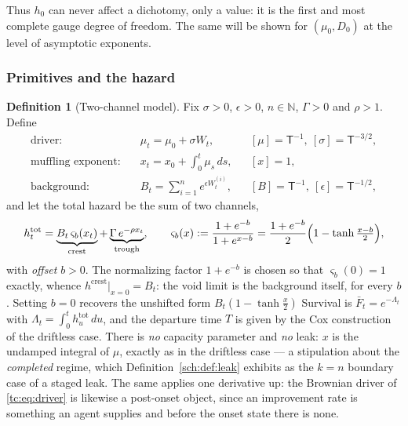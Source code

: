 \documentclass[11pt]{article}
\numberwithin{equation}{section}
\theoremstyle{plain}
\theoremstyle{definition}
\newtheorem{definition}[theorem]{Definition}
\theoremstyle{remark}
\begin{document}
Thus $h_0$ can never affect a dichotomy, only a value: it is the first and
most complete gauge degree of freedom. The same will be shown for
$(\mu_0,D_0)$ at the level of asymptotic exponents.

\subsubsection{Primitives and the hazard}\label{tc:subsub:primitives}

\begin{definition}[Two-channel model]\label{tc:def:model}
Fix $\sigma>0$, $\epsilon>0$, $n\in\mathbb N$, $\Gamma>0$ and
$\rho>1$. Define
\begin{align}
\text{driver:}&\quad \mu_t=\mu_0+\sigma W_t,
&&[\mu]=\mathsf T^{-1},\ [\sigma]=\mathsf T^{-3/2},
\label{tc:eq:driver}\\
\text{muffling exponent:}&\quad x_t=x_0+\int_0^t\mu_s\,ds,
&&[x]=1,
\label{tc:eq:x}\\
\text{background:}&\quad B_t=\sum_{i=1}^{n}e^{\epsilon W^{(i)}_t},
&&[B]=\mathsf T^{-1},\ [\epsilon]=\mathsf T^{-1/2},
\label{tc:eq:B}
\end{align}
and let the total hazard be the sum of two channels,
\begin{equation}\label{tc:eq:hazard}
h^{\mathrm{tot}}_t
=\underbrace{B_t\,\varsigma_b(x_t)}_{\text{crest}}
+\underbrace{\Gamma\,e^{-\rho x_t}}_{\text{trough}},
\qquad
\varsigma_b(x):=\frac{1+e^{-b}}{1+e^{x-b}}
=\frac{1+e^{-b}}{2}\Bigl(1-\tanh\tfrac{x-b}{2}\Bigr),
\end{equation}
with \emph{offset} $b>0$. The normalizing factor $1+e^{-b}$ is chosen so
that $\varsigma_b(0)=1$ exactly, whence $h^{\mathrm{crest}}|_{x=0}=B_t$:
the void limit is the background itself, for every $b$. Setting $b=0$
recovers the unshifted form $B_t(1-\tanh\frac{x}{2})$
Survival is $\bar F_t=e^{-\Lambda_t}$ with
$\Lambda_t=\int_0^t h^{\mathrm{tot}}_u\,du$, and the departure time $T$
is given by the Cox construction of the driftless case. There is \emph{no}
capacity parameter and \emph{no} leak: $x$ is the undamped integral of
$\mu$, exactly as in the driftless case --- a stipulation about the
\emph{completed} regime, which Definition~\ref{sch:def:leak} exhibits as
the $k=n$ boundary case of a staged leak. The same applies one derivative
up: the Brownian driver of \eqref{tc:eq:driver} is likewise a post-onset
object, since an improvement rate is something an agent supplies and
before the onset state there is none.
\end{definition}
\end{document}
